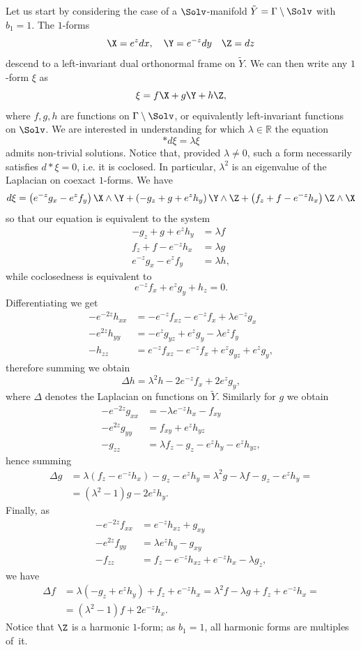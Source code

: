 Let us start by considering the case of a $\Solv$-manifold $\tilde{Y}=\Gamma\setminus \Solv$ with $b_1=1$. The $1$-forms
\[
\X=e^zdx,\quad \Y=e^{-z}dy\quad \Z=dz
\]
descend to a left-invariant dual orthonormal frame on $\tilde{Y}$. We can then write any $1$-form $\xi$ as
\[
\xi=f\X+g\Y+h\Z,
\]
where $f,g,h$ are functions on $\Gamma\setminus\Solv$, or equivalently left-invariant functions on $\Solv$. We are interested in understanding for which $\lambda\in\mathbb{R}$ the equation
\[
\ast d\xi=\lambda\xi
\]
admits non-trivial solutions. Notice that, provided $\lambda\neq0$, such a form necessarily satisfies $d\ast\xi=0$, i.e. it is coclosed. In particular, $\lambda^2$ is an eigenvalue of the Laplacian on coexact $1$-forms. We have
\[
d\xi=\left(e^{-z}g_x-e^zf_y\right)\X\wedge \Y+
\left(-g_z+g+e^zh_y\right)\Y\wedge \Z+
\left(f_z+f-e^{-z}h_x\right)\Z\wedge \X
\]
so that our equation is equivalent to the system
\begin{equation}\label{eqn}
\begin{split}
-g_z+g+e^zh_y&=\lambda f\\
f_z+f-e^{-z}h_x&=\lambda g\\
e^{-z}g_x-e^zf_y&=\lambda h, 
\end{split}
\end{equation}
while coclosedness is equivalent to
\[
e^{-z}f_x+e^zg_y+h_z=0.
\]
Differentiating we get
\begin{align*}
-e^{-2z}h_{xx}&=-e^{-z}f_{xz}-e^{-z}f_x+\lambda e^{-z}g_x\\
-e^{2z}h_{yy}&=-e^{z}g_{yz}+e^z g_y-\lambda e^{z}f_y\\
-h_{zz}&=e^{-z}f_{xz}-e^{-z}f_x+e^zg_{yz}+e^zg_y,
\end{align*}
therefore summing we obtain
\[
\Delta h=\lambda^2 h-2e^{-z}f_x+2e^zg_y,
\]
where $\Delta$ denotes the Laplacian on functions on $\tilde{Y}$. Similarly for $g$ we obtain
\begin{align*}
-e^{-2z}g_{xx}&=-\lambda e^{-z} h_x-f_{xy}\\
-e^{2z}g_{yy}&=f_{xy}+e^zh_{yz}\\
-g_{zz}&=\lambda f_z-g_z-e^zh_y-e^zh_{yz},
\end{align*}
hence summing
\begin{align*}
\Delta g&=\lambda(f_z-e^{-z}h_x)-g_z-e^zh_y=\lambda^2g-\lambda f-g_z-e^zh_y=\\
&=\left(\lambda^2-1\right)g-2e^z h_y.
\end{align*}
Finally, as
\begin{align*}
-e^{-2z}f_{xx}&=e^{-z}h_{xz}+g_{xy}\\
-e^{2z}f_{yy}&=\lambda e^z h_y-g_{xy}\\
-f_{zz}&=f_z-e^{-z}h_{xz}+e^{-z}h_x-\lambda g_z,
\end{align*}
we have
\begin{align*}
\Delta f&=\lambda(-g_z+e^zh_y)+f_z+e^{-z}h_x=\lambda^2 f-\lambda g+f_z+e^{-z}h_x=\\
&=\left(\lambda^2-1\right)f+2e^{-z}h_x.
\end{align*}
Notice that $\Z$ is a harmonic $1$-form; as $b_1=1$, all harmonic forms are multiples of~it.

